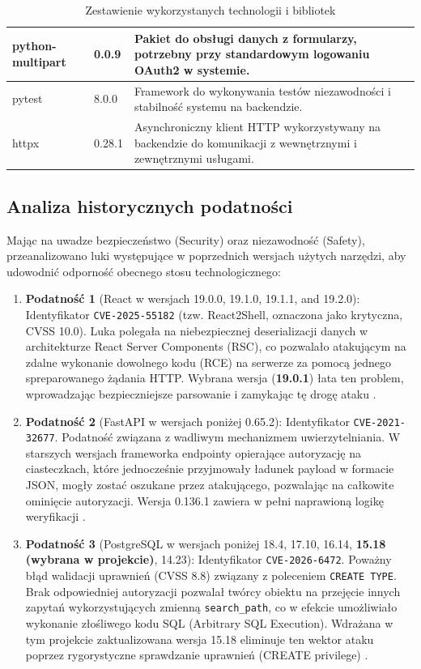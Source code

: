 \documentclass[12pt,twoside]{article}
\begin{document}
\begin{table}[htbp]
\begin{tabular}{|l|l|p{7cm}|}
    python-multipart & 0.0.9 & Pakiet do obsługi danych z formularzy, potrzebny przy standardowym logowaniu OAuth2 w systemie. \\ \hline
    pytest & 8.0.0 & Framework do wykonywania testów niezawodności i stabilność systemu na backendzie. \\ \hline
    httpx & 0.28.1 & Asynchroniczny klient HTTP wykorzystywany na backendzie do komunikacji z wewnętrznymi i zewnętrznymi usługami. \\ \hline
    \end{tabular}
    \caption{Zestawienie wykorzystanych technologii i bibliotek}
    \label{tab:tech_stack}
\end{table}

\subsection{Analiza historycznych podatności}
Mając na uwadze bezpieczeństwo (Security) oraz niezawodność (Safety), przeanalizowano luki występujące w poprzednich wersjach użytych narzędzi, aby udowodnić odporność obecnego stosu technologicznego:

\begin{enumerate}
    \item \textbf{Podatność 1} (React w wersjach  19.0.0, 19.1.0, 19.1.1, and 19.2.0): Identyfikator \texttt{CVE-2025-55182} (tzw. React2Shell, oznaczona jako krytyczna, CVSS 10.0). Luka polegała na niebezpiecznej deserializacji danych w architekturze React Server Components (RSC), co pozwalało atakującym na zdalne wykonanie dowolnego kodu (RCE) na serwerze za pomocą jednego spreparowanego żądania HTTP. Wybrana wersja (\textbf{19.0.1}) łata ten problem, wprowadzając bezpieczniejsze parsowanie i zamykając tę drogę ataku \cite{react-vuln}.
    \item \textbf{Podatność 2} (FastAPI w wersjach poniżej 0.65.2): Identyfikator \texttt{CVE-2021-32677}. Podatność związana z wadliwym mechanizmem uwierzytelniania. W starszych wersjach frameworka endpointy opierające autoryzację na ciasteczkach, które jednocześnie przyjmowały ładunek payload w formacie JSON, mogły zostać oszukane przez atakującego, pozwalając na całkowite ominięcie autoryzacji. Wersja 0.136.1 zawiera w pełni naprawioną logikę weryfikacji \cite{fastapi-vuln}.
    \item \textbf{Podatność 3} (PostgreSQL w wersjach poniżej 18.4, 17.10, 16.14, \textbf{15.18 (wybrana w projekcie)}, 14.23): Identyfikator \texttt{CVE-2026-6472}. Poważny błąd walidacji uprawnień (CVSS 8.8) związany z poleceniem \texttt{CREATE TYPE}. Brak odpowiedniej autoryzacji pozwalał twórcy obiektu na przejęcie innych zapytań wykorzystujących zmienną \texttt{search\_path}, co w efekcie umożliwiało wykonanie złośliwego kodu SQL (Arbitrary SQL Execution). Wdrażana w tym projekcie zaktualizowana wersja 15.18 eliminuje ten wektor ataku poprzez rygorystyczne sprawdzanie uprawnień (CREATE privilege) \cite{postgres-vuln}.
\end{enumerate}
\end{document}
